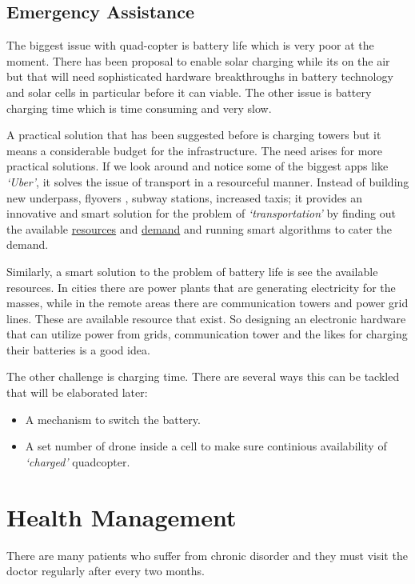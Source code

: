 \documentclass{article}
\begin{document}
\begin{multicols}{2}
\section{Emergency Assistance}
The biggest issue with quad-copter is battery life which is very poor at the moment. There has been proposal to enable solar charging while its on the air but that will need sophisticated hardware breakthroughs in battery technology and solar cells in particular before it can viable. The other issue is battery charging time which is time consuming and very slow.

A practical solution that has been suggested before is charging towers but it means a considerable budget for the infrastructure. The need arises for more practical solutions. If we look around and notice some of the biggest apps like \textit{`Uber'}, it solves the issue of transport in a resourceful manner. Instead of building new underpass, flyovers , subway stations, increased taxis; it provides an innovative and smart solution for the problem of \textit{`transportation'} by finding out the available \underline{resources} and \underline{demand} and running smart algorithms to cater the demand. 


Similarly, a smart solution to the problem of battery life is see the available resources. In cities there are power plants that are generating electricity for the masses, while in the remote areas there are communication towers and power grid lines. These are available resource that exist. So designing an electronic hardware that can utilize power from grids, communication tower and the likes for charging their batteries is a good idea.

The other challenge is charging time. There are several ways this can be tackled that will be elaborated later:
\begin{itemize}
\item A mechanism to switch the battery.
\item A set number of drone inside a cell to make sure continious availability of \textit{`charged'} quadcopter. 
\end{itemize}


\end{multicols}




\section{Health Management}
There are many patients who suffer from chronic disorder and they must visit the doctor regularly after every two months.
\end{document}
